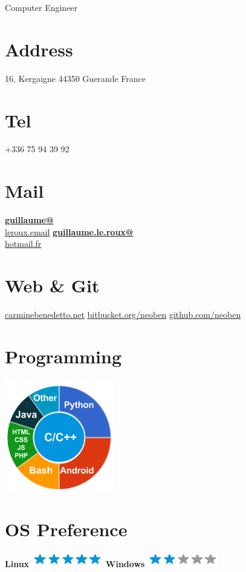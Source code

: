 \documentclass[]{friggeri-cv}
\begin{document}
      {Computer Engineer}


\begin{aside}
	\section{Address}
	16, Kergaigne
	44350 Guerande
	France
	~
	\section{Tel}
	+336 75 94 39 92
	~
	\section{Mail}
	\href{mailto:guillaume@leroux.email}{\textbf{guillaume@}\\leroux.email}
	\href{mailto:guillaume.le.roux@hotmail.fr}{\textbf{guillaume.le.roux@}\\hotmail.fr}
	~
	\section{Web \& Git}
	\href{http://www.carminebenedetto.net}{carminebenedetto.net}
	\href{https://bitbucket.org/neoben}{bitbucket.org/neoben}
	\href{https://github.com/neoben}{github.com/neoben}
	~
	\section{Programming}
	\includegraphics[scale=0.62]{img/programming.png}
	~
	\section{OS Preference}
	\textbf{Linux}\includegraphics[scale=0.40]{img/5stars.png}
	\textbf{Windows}\includegraphics[scale=0.40]{img/2stars.png}
	~

\end{aside}
\end{document}
